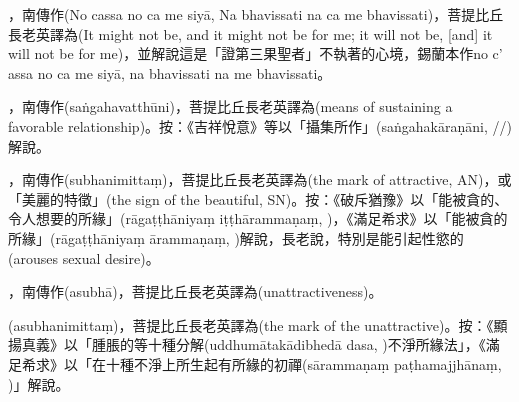 \startitemgroup[noteitems]
\item{}，南傳作(No cassa no ca me siyā, Na bhavissati na ca me bhavissati)，菩提比丘長老英譯為(It might not be, and it might not be for me; it will not be, [and] it will not be for me)，並解說這是「證第三果聖者」不執著的心境，錫蘭本作no c’ assa no ca me siyā, na bhavissati na me bhavissati。
\stopitemgroup

\startitemgroup[noteitems]
\item{}，南傳作(saṅgahavatthūni)，菩提比丘長老英譯為(means of sustaining a favorable relationship)。按：《吉祥悅意》等以「攝集所作」(saṅgahakāraṇāni, //)解說。
\stopitemgroup

\startitemgroup[noteitems]
\item{}，南傳作(subhanimittaṃ)，菩提比丘長老英譯為(the mark of attractive, AN)，或「美麗的特徵」(the sign of the beautiful, SN)。按：《破斥猶豫》以「能被貪的、令人想要的所緣」(rāgaṭṭhāniyaṃ iṭṭhārammaṇaṃ, )，《滿足希求》以「能被貪的所緣」(rāgaṭṭhāniyaṃ ārammaṇaṃ, )解說，長老說，特別是能引起性慾的(arouses sexual desire)。
\item{}，南傳作(asubhā)，菩提比丘長老英譯為(unattractiveness)。
\item{}(asubhanimittaṃ)，菩提比丘長老英譯為(the mark of the unattractive)。按：《顯揚真義》以「腫脹的等十種分解(uddhumātakādibhedā dasa, )不淨所緣法」，《滿足希求》以「在十種不淨上所生起有所緣的初禪(sārammaṇaṃ paṭhamajjhānaṃ, )」解說。
\stopitemgroup

